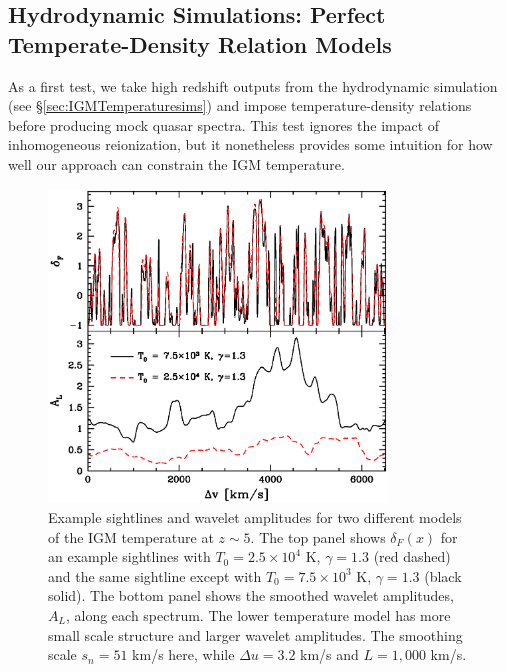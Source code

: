 \subsection{Hydrodynamic Simulations: Perfect Temperate-Density Relation Models}

As a first test, we take high redshift outputs from the hydrodynamic simulation (see \S \ref{sec:IGMTemperaturesims}) and impose temperature-density relations
before producing mock quasar spectra. This test ignores the impact of inhomogeneous reionization, but it nonetheless provides
some intuition for how well our approach can constrain the IGM temperature.

\begin{figure}
\bc
\includegraphics[width=9cm]{f10.eps}
\caption{Example sightlines and wavelet amplitudes for two different models of the IGM temperature at $z \sim 5$.
The top panel shows $\delta_F(x)$ for an example sightlines with $T_0 = 2.5 \times 10^4$ K, $\gamma=1.3$ (red dashed) and the same sightline except with $T_0 = 7.5 \times
10^3$ K, $\gamma=1.3$ (black solid). The bottom panel shows the smoothed wavelet amplitudes, $A_L$, along each spectrum.
The lower temperature model has more small scale structure and larger wavelet amplitudes. The smoothing scale $s_n=51$ km/s here, while
$\Delta u = 3.2$ km/s and $L=1,000$ km/s.}
\label{fig:examp_sightlines}
\ec
\end{figure}

